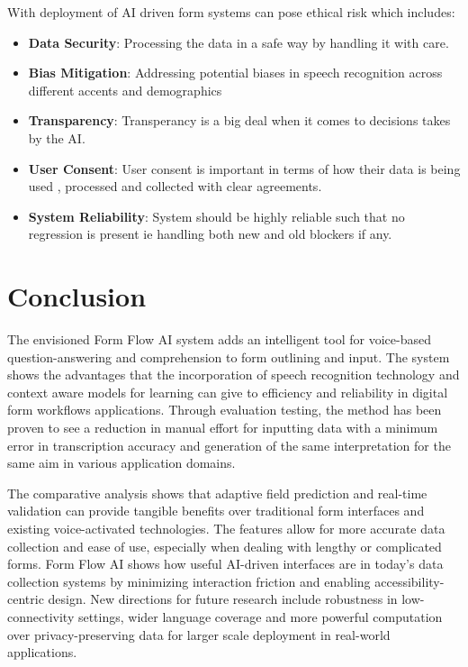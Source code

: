 \documentclass[conference]{IEEEtran}
\begin{document}
With deployment of AI driven form systems can pose ethical risk which includes:

\begin{itemize}
\item \textbf{Data Security}: Processing the data in a safe way by handling it with care.
\item \textbf{Bias Mitigation}: Addressing potential biases in speech recognition across different accents and demographics
\item \textbf{Transparency}: Transperancy is a big deal when it comes to decisions takes by the AI.
\item \textbf{User Consent}: User consent is important in terms of how their data is being used , processed and collected with clear agreements.
\item \textbf{System Reliability}: System should be highly reliable such that no regression is present ie handling both new and old blockers if any.
\end{itemize}

\section{Conclusion}

The envisioned Form Flow AI system adds an intelligent tool for voice-based question-answering and comprehension to form outlining and input. The system shows the advantages that the incorporation of speech recognition technology and context aware models for learning can give to efficiency and reliability in digital form workflows applications. Through evaluation testing, the method has been proven to see a reduction in manual effort for inputting data with a minimum error in transcription accuracy and generation of the same interpretation for the same aim in various application domains.

The comparative analysis shows that adaptive field prediction and real-time validation can provide tangible benefits over traditional form interfaces and existing voice-activated technologies. The features allow for more accurate data collection and ease of use, especially when dealing with lengthy or complicated forms. Form Flow AI shows how useful AI-driven interfaces are in today's data collection systems by minimizing interaction friction and enabling accessibility-centric design. New directions for future research include robustness in low-connectivity settings, wider language coverage and more powerful computation over privacy-preserving data for larger scale deployment in real-world applications.
\end{document}
